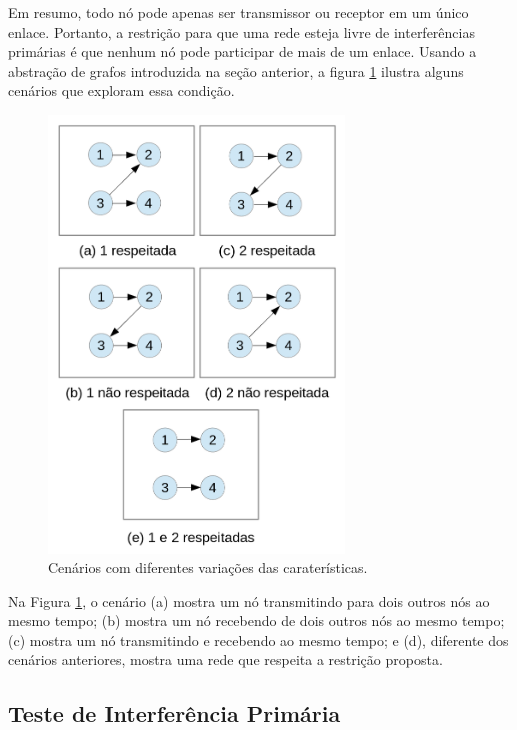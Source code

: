 Em resumo, todo nó pode apenas ser transmissor ou receptor em um único enlace. Portanto, a restrição para que uma rede esteja livre de interferências primárias é que nenhum nó pode participar de mais de um enlace. Usando a abstração de grafos introduzida na seção anterior, a figura \ref{fig:primario} ilustra alguns cenários que exploram essa condição.

\begin{figure}[htb]
\centering
\includegraphics[width=0.7\textwidth]{figs/primario}
\caption[Cenários com diferentes variações das caraterísticas.]
{Cenários com diferentes variações das caraterísticas.}
\label{fig:primario}
\end{figure}

Na Figura \ref{fig:primario}, o cenário (a) mostra um nó transmitindo para dois outros nós ao mesmo tempo; (b) mostra um nó recebendo de dois outros nós ao mesmo tempo; (c) mostra um nó transmitindo e recebendo ao mesmo tempo; e (d), diferente dos cenários anteriores, mostra uma rede que respeita a restrição proposta.   

\subsection{Teste de Interferência Primária}

